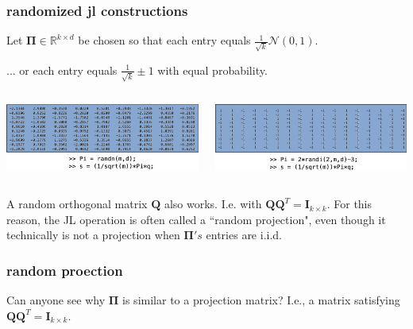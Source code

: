 \documentclass[compress]{beamer}
\newcommand{\bs}[1]{\boldsymbol{#1}}
\newcommand{\bv}[1]{\mathbf{#1}}
\newcommand{\R}{\mathbb{R}}
\begin{document}
\begin{frame}
	\frametitle{randomized jl constructions}
	\begin{center}
		Let $\bs{\Pi} \in \R^{k\times d}$ be chosen so that each entry equals $\frac{1}{\sqrt{k}}  \mathcal{N}(0,1)$.
		
		... or each entry equals $\frac{1}{\sqrt{k}}  \pm 1$ with equal probability.
	\end{center}
	\vspace{1em}
	
	\begin{columns}
		\begin{column}{0.5\textwidth}
			\includegraphics[width=\textwidth]{rand_gauss.png}
		\end{column}
		\begin{column}{0.5\textwidth}
			\includegraphics[width=\textwidth]{rand_sign.png}
		\end{column}
	\end{columns}
	
	\begin{center}
		A random orthogonal matrix $\bv{Q}$ also works. I.e. with $\bv{Q}\bv{Q}^T = \bv{I}_{k\times k}$. For this reason, the JL operation is often called a ``random projection", even though it technically is not a projection when $\bs{\Pi}'s$ entries are i.i.d.
	\end{center}
\end{frame}

\begin{frame}[t]
	\frametitle{random proection}
	Can anyone see why $\bs{\Pi}$ is similar to a projection matrix? I.e., a matrix satisfying  $\bv{Q}\bv{Q}^T = \bv{I}_{k\times k}$.
\end{frame}
\end{document}
